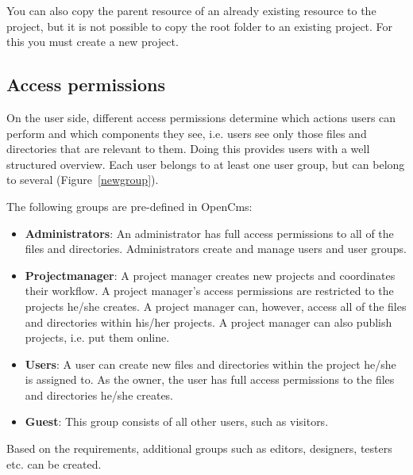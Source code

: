 \begin{itemize}
You can also copy the parent resource of an already existing
resource to the project, but it is not possible to copy the root
folder to an existing project. For this you must create a new
project.

\end{itemize}

\subsection{Access permissions}

On the user side, different access permissions determine which
actions users can perform and which components they see, i.e.
users see only those files and directories that are relevant to
them. Doing this provides users with a well structured overview.
Each user belongs to at least one user group, but can belong to
several (Figure~\ref{newgroup}).

The following groups are pre-defined in OpenCms:

\begin{itemize}
\item \textbf{Administrators}: An administrator has full access permissions to
all of the files and directories. Administrators create and manage
users and user groups.
\item \textbf{Projectmanager}: A project manager creates new projects and coordinates their workflow. A project manager's access permissions are restricted to the projects he/she creates. A project manager can, however, access all of the files and directories within his/her projects. A project manager can also publish projects, i.e. put them online.
\item \textbf{Users}: A user can create new files and directories within the project he/she is assigned to. As the owner, the user has full access permissions to the files and directories he/she creates.
\item \textbf{Guest}: This group consists of all other users, such as visitors.
\end{itemize}

Based on the requirements, additional groups such as editors,
designers, testers etc. can be created.

